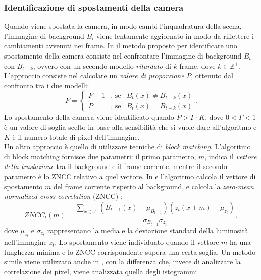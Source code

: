 \subsubsection{Identificazione di spostamenti della camera}
Quando viene spostata la camera, in modo cambi l'inquadratura della scena, l'immagine di background $B_i$ viene lentamente aggiornato in modo da riflettere i cambiamenti avvenuti nei frame. 
In \cite{saglam2009real} il metodo proposto per identificare uno spostamento della camera consiste nel confrontare l'immagine di background $B_t$ con $B_{t-k}$, ovvero con un secondo modello \textit{ritardato} di $k$ frame, dove $k \in \mathbb{Z}^+$.
L'approccio consiste nel calcolare un \textit{valore di proporzione} $P$, ottenuto dal confronto tra i due modelli:
\[
\label{eq:displEqSaglam}
P=\left\{ \begin{array} {lcl}
P+1 & \mbox{, se} & B_t(x) \neq B_{t-k}(x) \\
P & \mbox{, se} & B_t(x) = B_{t-k}(x) \end{array} \right. .
\]
Lo spostamento della camera viene identificato quando $P > \Gamma \cdot K$, dove $0<\Gamma<1$ \`e un valore di soglia scelto in base alla sensibilit\`a che si vuole dare all'algoritmo e $K$ \`e il numero totale di pixel dell'immagine.\\
Un altro approccio \`e quello di utilizzare tecniche di \textit{block matching}.
L'algoritmo di block matching fornisce due parametri:
il primo parametro, $m$, indica il \textit{vettore della traslazione} tra il background e il frame corrente, mentre il secondo parametro \`e lo ZNCC relativo a quel vettore.
In \cite{gil2007automatic} e \cite{harasse2004automated} l'algoritmo calcola il vettore di spostamento $m$ del frame corrente rispetto al background, e calcola la \textit{zero-mean normalized cross correlation} (ZNCC) \cite{roma2002comparative}:
\[
ZNCC_t(m) = \frac{\sum_{x \in \mathcal{X}}(B_{t-1}(x)- \mu_{B_{t-1}})(z_t(x+m)-\mu_{z_t})}{\sigma_{B_{t-1}} \sigma_{z_t}},
\]
dove $\mu_{z_t}$ e $\sigma_{z_t}$ rappresentano la media e la deviazione standard della luminosit\`a nell'immagine $z_t$.
Lo spostamento viene individuato quando il vettore $m$ ha una lunghezza minima e lo ZNCC corrispondente supera una certa soglia.
Un metodo simile viene utilizzato anche in \cite{kryjak2012fpga}, con la differenza che, invece di analizzare la correlazione dei pixel, viene analizzata quella degli istogrammi. 

